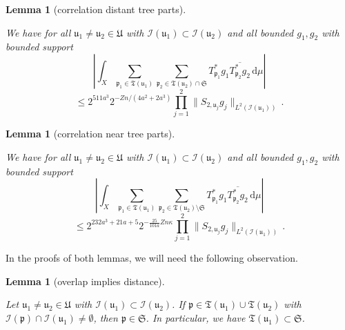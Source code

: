 \documentclass[10pt,a4paper]{article}
\theoremstyle{plain}
\newtheorem{lemma}[theorem]{Lemma}
\theoremstyle{definition}
\numberwithin{equation}{subsection}
\newcommand{\fp}{{\mathfrak p}}
\newcommand{\fu}{{\mathfrak u}}
\newcommand{\fU}{{\mathfrak U}}
\newcommand{\fT}{{\mathfrak T}}
\newcommand{\scI}{{\mathcal{I}}} %
\newcommand{\lean}[1]{}
\newcommand{\uses}[1]{}
\newcommand{\leanok}{}
\begin{document}
\begin{lemma}[correlation distant tree parts]
        \label{correlation-distant-tree-parts}
        \leanok
        \lean{TileStructure.Forest.correlation_distant_tree_parts}
        \uses{Holder-van-der-Corput,Lipschitz-partition-unity,Holder-correlation-tree,lower-oscillation-bound}
        We have for all $\fu_1 \ne \fu_2 \in \fU$ with $\scI(\fu_1) \subset \scI(\fu_2)$ and all bounded $g_1, g_2$ with bounded support
      \begin{equation}
            \label{eq-lhs-big-sep-tree}
            \left| \int_X \sum_{\fp_1 \in \fT(\fu_1)} \sum_{\fp_2 \in \fT(\fu_2) \cap \mathfrak{S}} T^*_{\fp_1}g_1 \overline{T^*_{\fp_2}g_2 }\,\mathrm{d}\mu \right|
        \end{equation}
      \begin{equation}
            \label{eq-rhs-big-sep-tree}
            \le 2^{511a^3} 2^{-Zn/(4a^2 + 2a^3)} \prod_{j =1}^2 \| S_{2, \fu_j} g_j\|_{L^2(\scI(\fu_1))}\,.
        \end{equation}
    \end{lemma}
    \begin{lemma}[correlation near tree parts]
        \label{correlation-near-tree-parts}
        \leanok
        \lean{TileStructure.Forest.correlation_near_tree_parts}
        \uses{tree-projection-estimate,dyadic-partition-2,bound-for-tree-projection}
        We have for all $\fu_1 \ne \fu_2 \in \fU$ with $\scI(\fu_1) \subset \scI(\fu_2)$ and all bounded $g_1, g_2$ with bounded support
      \begin{equation}
            \label{eq-lhs-small-sep-tree}
            \left| \int_X \sum_{\fp_1 \in \fT(\fu_1)} \sum_{\fp_2 \in \fT(\fu_2) \setminus \mathfrak{S}} T^*_{\fp_1}g_1 \overline{T^*_{\fp_2}g_2 }\,\mathrm{d}\mu \right|
        \end{equation}
      \begin{equation}
            \label{eq-rhs-small-sep-tree}
            \le 2^{232a^3+21a+5} 2^{-\frac{25}{101a}Zn\kappa} \prod_{j=1}^2 \|S_{2, \fu_j} g_j\|_{L^2(\scI(\fu_1))}\,.
        \end{equation}
    \end{lemma}

In the proofs of both lemmas, we will need the following observation.

\begin{lemma}[overlap implies distance]
    \label{overlap-implies-distance}
    \leanok
    \lean{TileStructure.Forest.𝔗_subset_𝔖₀, TileStructure.Forest.overlap_implies_distance}
    Let $\fu_1 \ne \fu_2 \in \fU$ with $\scI(\fu_1) \subset \scI(\fu_2)$. If $\fp \in \fT(\fu_1) \cup \fT(\fu_2)$ with $\scI(\fp) \cap \scI(\fu_1) \ne \emptyset$, then $\fp \in \mathfrak{S}$. In particular, we have $\fT(\fu_1) \subset \mathfrak{S}$.
\end{lemma}
\end{document}
